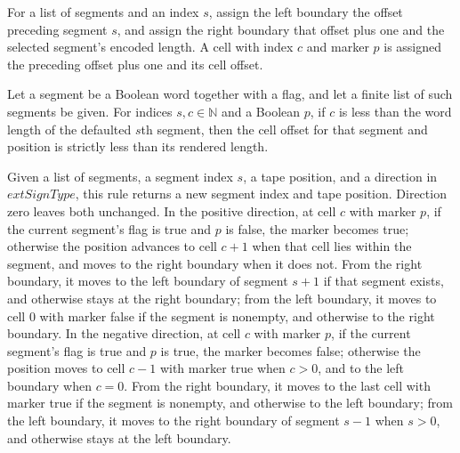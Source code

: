 \begin{definition}
\label{Complexity.LogProg.vpos}
\leanok
{}
For a list of segments and an index $s$, assign the left boundary the offset preceding
segment $s$, and assign the right boundary that offset plus one and the selected
segment's encoded length. A cell with index $c$ and marker $p$ is assigned the preceding
offset plus one and its cell offset.
\end{definition}

\begin{lemma}
\label{Complexity.LogProg.cellOff_lt}
\leanok
{}
Let a segment be a Boolean word together with a flag, and let a finite list of such
segments be given. For indices $s,c\in\mathbb{N}$ and a Boolean $p$, if $c$ is less than
the word length of the defaulted $s$th segment, then the cell offset for that segment
and position is strictly less than its rendered length.
\end{lemma}

\begin{definition}
\label{Complexity.LogProg.tmove}
\leanok
{}
Given a list of segments, a segment index $s$, a tape position, and a direction in
$	ext{SignType}$, this rule returns a new segment index and tape position. Direction
zero leaves both unchanged. In the positive direction, at cell $c$ with marker $p$, if
the current segment's flag is true and $p$ is false, the marker becomes true; otherwise
the position advances to cell $c+1$ when that cell lies within the segment, and moves to
the right boundary when it does not. From the right boundary, it moves to the left
boundary of segment $s+1$ if that segment exists, and otherwise stays at the right
boundary; from the left boundary, it moves to cell $0$ with marker false if the segment
is nonempty, and otherwise to the right boundary. In the negative direction, at cell $c$
with marker $p$, if the current segment's flag is true and $p$ is true, the marker
becomes false; otherwise the position moves to cell $c-1$ with marker true when $c>0$,
and to the left boundary when $c=0$. From the right boundary, it moves to the last cell
with marker true if the segment is nonempty, and otherwise to the left boundary; from
the left boundary, it moves to the right boundary of segment $s-1$ when $s>0$, and
otherwise stays at the left boundary.
\end{definition}

